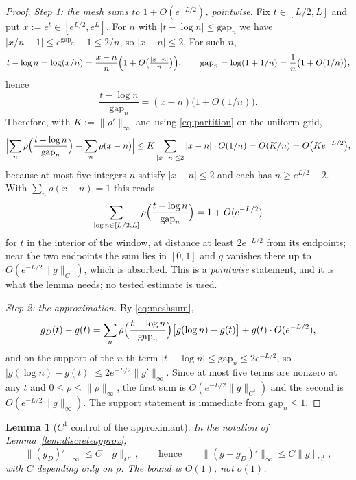 \documentclass[11pt]{amsart}
\newtheorem{lemma}[theorem]{Lemma}
\theoremstyle{definition}
\theoremstyle{remark}
\begin{document}
\begin{proof}
\emph{Step 1: the mesh sums to $1+O(e^{-L/2})$, pointwise.} Fix
$t\in[L/2,L]$ and put $x:=e^t\in[e^{L/2},e^L]$. For $n$ with
$|t-\log n|\le\mathrm{gap}_n$ we have $|x/n-1|\le e^{\mathrm{gap}_n}-1\le2/n$,
so $|x-n|\le2$. For such $n$,
\[
  t-\log n=\log(x/n)=\frac{x-n}{n}\Bigl(1+O\bigl(\tfrac{|x-n|}{n}\bigr)\Bigr),
  \qquad
  \mathrm{gap}_n=\log(1+1/n)=\frac1n\bigl(1+O(1/n)\bigr),
\]
hence
\begin{equation}\label{eq:gapratio}
  \frac{t-\log n}{\mathrm{gap}_n}=(x-n)\bigl(1+O(1/n)\bigr).
\end{equation}
Therefore, with $K:=\|\rho'\|_\infty$ and using \eqref{eq:partition} on the
uniform grid,
\[
  \Bigl|\sum_n\rho\Bigl(\frac{t-\log n}{\mathrm{gap}_n}\Bigr)
   -\sum_n\rho(x-n)\Bigr|
   \le K\sum_{|x-n|\le2}|x-n|\cdot O(1/n)=O(K/n)=O\bigl(Ke^{-L/2}\bigr),
\]
because at most five integers $n$ satisfy $|x-n|\le2$ and each has
$n\ge e^{L/2}-2$. With $\sum_n\rho(x-n)=1$ this reads
\begin{equation}\label{eq:meshsum}
  \sum_{\log n\in[L/2,L]}\rho\Bigl(\frac{t-\log n}{\mathrm{gap}_n}\Bigr)
   =1+O(e^{-L/2})
\end{equation}
for $t$ in the interior of the window, at distance at least $2e^{-L/2}$ from
its endpoints; near the two endpoints the sum lies in $[0,1]$ and $g$ vanishes
there up to $O(e^{-L/2}\|g\|_{C^1})$, which is absorbed. This is a
\emph{pointwise} statement, and it is what the lemma needs; no tested estimate
is used.

\emph{Step 2: the approximation.} By \eqref{eq:meshsum},
\[
  g_D(t)-g(t)=\sum_n\rho\Bigl(\frac{t-\log n}{\mathrm{gap}_n}\Bigr)
   \bigl[g(\log n)-g(t)\bigr]+g(t)\cdot O(e^{-L/2}),
\]
and on the support of the $n$-th term
$|t-\log n|\le\mathrm{gap}_n\le2e^{-L/2}$, so
$|g(\log n)-g(t)|\le2e^{-L/2}\|g'\|_\infty$. Since at most five terms are
nonzero at any $t$ and $0\le\rho\le\|\rho\|_\infty$, the first sum is
$O(e^{-L/2}\|g\|_{C^1})$ and the second is $O(e^{-L/2}\|g\|_\infty)$. The
support statement is immediate from $\mathrm{gap}_n\le1$.
\end{proof}

\begin{lemma}[$C^1$ control of the approximant]\label{lem:C1control}
In the notation of Lemma~\ref{lem:discreteapprox},
\begin{equation}\label{eq:C1bound}
  \|(g_D)'\|_\infty\le C\|g\|_{C^1},\qquad\text{hence}\qquad
  \|(g-g_D)'\|_\infty\le C\|g\|_{C^1},
\end{equation}
with $C$ depending only on $\rho$. The bound is $O(1)$, not $o(1)$.
\end{lemma}
\end{document}
